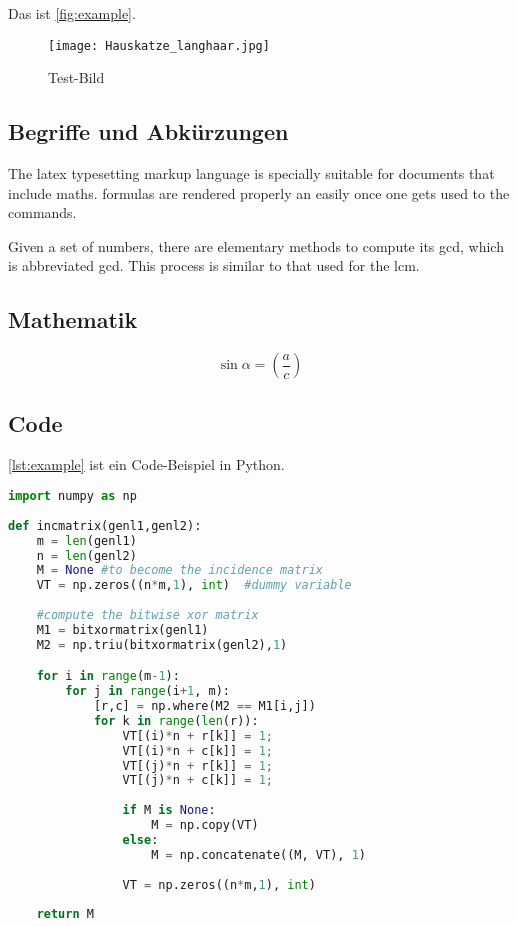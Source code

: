 Das ist \autoref{fig:example}.

\begin{figure}[tbh]
 \centering
 \texttt{[image: Hauskatze\_langhaar.jpg]}
 \caption{Test-Bild}
 \label{fig:example}
\end{figure}

\subsection{Begriffe und Abkürzungen}
The \Gls{latex} typesetting markup language is specially suitable for documents that include \gls{maths}. \Glspl{formula} are rendered properly an easily once one gets used to the commands.

Given a set of numbers, there are elementary methods to compute its \acrlong{gcd}, which is abbreviated \acrshort{gcd}. This process is similar to that used for the \acrfull{lcm}.

\subsection{Mathematik}

\begin{equation}
 \sin \alpha = \left( \frac{a}{c} \right)
\end{equation}

\subsection{Code}

\autoref{lst:example} ist ein Code-Beispiel in Python.

\begin{lstlisting}[language=Python, caption=Code-Beispiel mit Python, label={lst:example}]
import numpy as np
    
def incmatrix(genl1,genl2):
    m = len(genl1)
    n = len(genl2)
    M = None #to become the incidence matrix
    VT = np.zeros((n*m,1), int)  #dummy variable
    
    #compute the bitwise xor matrix
    M1 = bitxormatrix(genl1)
    M2 = np.triu(bitxormatrix(genl2),1) 

    for i in range(m-1):
        for j in range(i+1, m):
            [r,c] = np.where(M2 == M1[i,j])
            for k in range(len(r)):
                VT[(i)*n + r[k]] = 1;
                VT[(i)*n + c[k]] = 1;
                VT[(j)*n + r[k]] = 1;
                VT[(j)*n + c[k]] = 1;
                
                if M is None:
                    M = np.copy(VT)
                else:
                    M = np.concatenate((M, VT), 1)
                
                VT = np.zeros((n*m,1), int)
    
    return M
\end{lstlisting}
